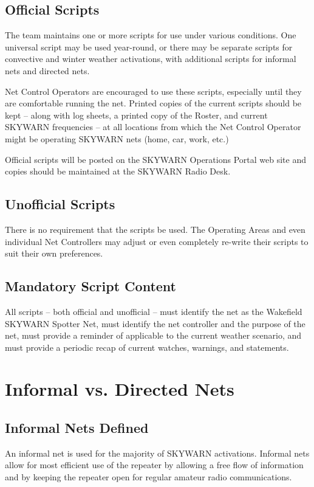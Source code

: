 \documentclass[pdflatex,letterpaper,twoside,12pt]{book}
\begin{document}
\subsection{Official Scripts}

The team maintains one or more scripts for use under various conditions.  One universal script may be used year-round, or there may be separate scripts for convective and winter weather activations, with additional scripts for informal nets and directed nets.

Net Control Operators are encouraged to use these scripts,  especially until they are comfortable running the net.  Printed copies of the current scripts should be kept – along with log sheets, a printed copy of the Roster, and current SKYWARN frequencies – at all locations from which the Net Control Operator might be operating SKYWARN nets (home, car, work, etc.)

Official scripts will be posted on the SKYWARN Operations Portal web site and copies should be maintained at the SKYWARN Radio Desk.

\subsection{Unofficial Scripts}

There is no requirement that the scripts be used. The Operating Areas and even individual Net Controllers may adjust or even completely re-write their scripts to suit their own preferences.

\subsection{Mandatory Script Content}\label{mandatory-content}

All scripts – both official and unofficial – must identify the net as the Wakefield SKYWARN Spotter Net, must identify the net controller and the purpose of the net, must provide a reminder of  applicable to the current weather scenario, and must provide a periodic recap of current watches, warnings, and statements.


\section{Informal vs. Directed Nets}

\subsection{Informal Nets Defined}
An informal net is used for the majority of SKYWARN activations.  Informal nets allow for most efficient use of the repeater by allowing a free flow of information and by keeping the repeater open for regular amateur radio communications.
\end{document}
